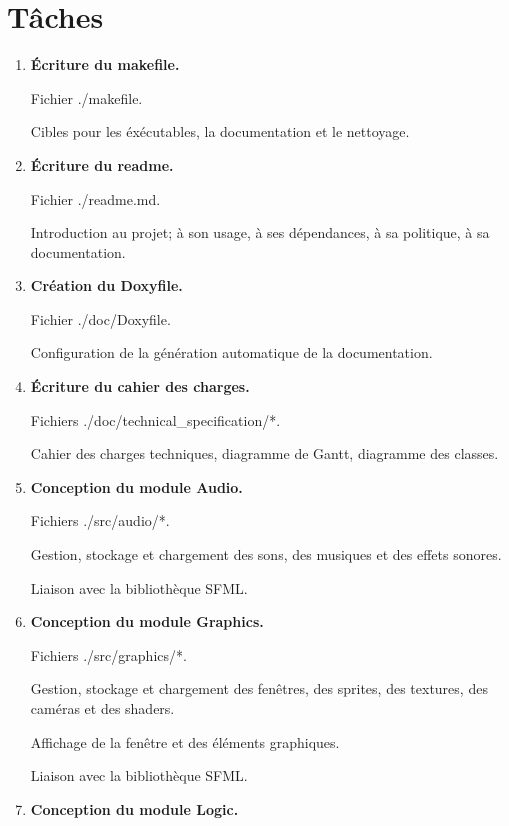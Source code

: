 \documentclass[french]{report}
\begin{document}
\section{Tâches}

\begin{enumerate}
    \item \textbf{Écriture du makefile.}
    
    Fichier ./makefile.

    Cibles pour les éxécutables, la documentation et le nettoyage.
    
    \item \textbf{Écriture du readme.}
    
    Fichier ./readme.md.

    Introduction au projet;
    à son usage, à ses dépendances, à sa politique, à sa documentation.

    \item \textbf{Création du Doxyfile.}
    
    Fichier ./doc/Doxyfile.

    Configuration de la génération automatique de la documentation.

    \item \textbf{Écriture du cahier des charges.}
    
    Fichiers ./doc/technical\_specification/*.

    Cahier des charges techniques,
    diagramme de Gantt, diagramme des classes.

    \item \textbf{Conception du module Audio.}
    
    Fichiers ./src/audio/*.

    Gestion, stockage et chargement
    des sons, des musiques et des effets sonores.

    Liaison avec la bibliothèque SFML.

    \item \textbf{Conception du module Graphics.}
    
    Fichiers ./src/graphics/*.

    Gestion, stockage et chargement
    des fenêtres, des sprites, des textures,
    des caméras et des shaders.

    Affichage de la fenêtre et des éléments graphiques.

    Liaison avec la bibliothèque SFML.

    \item \textbf{Conception du module Logic.}
    

\end{enumerate}
\end{document}
